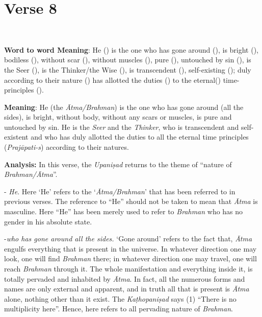 \chapter{Verse 8}

\begin{moolashloka}
\\
\end{moolashloka}

\textbf{Word to word Meaning}: He () is the one who has gone around (), is bright (), bodiless (), without scar (), without muscles (), pure (), untouched by sin (), is the Seer (), is the Thinker/the Wise (), is transcendent (), self-existing (); duly according to their nature () has allotted the duties () to the eternal() time-principles ().

\textbf{Meaning}: He (the \emph{Ātma/Brahman}) is the one who has gone around (all the sides), is bright, without body, without any scars or muscles, is pure and untouched by sin. He is the \emph{Seer} and the \emph{Thinker}, who is transcendent and self-existent and who has duly allotted the duties to all the eternal time principles (\emph{Prajāpati-s}) according to their natures.

\textbf{Analysis:} In this verse, the \emph{Upaniṣad} returns to the theme of ``nature of \emph{Brahman/Ātma}''.

- \emph{He}. Here `He' refers to the `\emph{Ātma/Brahman}' that has been referred to in previous verses. The reference to ``He'' should not be taken to mean that \emph{Ātma} is masculine. Here ``He'' has been merely used to refer to \emph{Brahman} who has no gender in his absolute state.

-\emph{who has gone around all the sides.} `Gone around' refers to the fact that, \emph{Ātma} engulfs everything that is present in the universe. In whatever direction one may look, one will find \emph{Brahman} there; in whatever direction one may travel, one will reach \emph{Brahman} through it. The whole manifestation and everything inside it, is totally pervaded and inhabited by \emph{Ātma}. In fact, all the numerous forms and names are only external and apparent, and in truth all that is present is \emph{Ātma} alone, nothing other than it exist. The \emph{Kaṭhopaniṣad} says (1) ``There is no multiplicity here''. Hence, here  refers to all pervading nature of \emph{Brahman}.
\newpage

